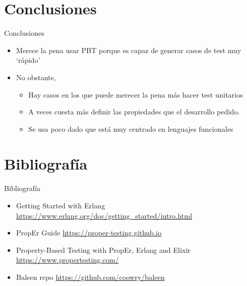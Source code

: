 \documentclass{beamer}
\begin{document}
  \section{Conclusiones}
    \begin{frame}{Conclusiones}
      \begin{itemize}
        \item Merece la pena usar PBT porque es capaz de generar casos de test muy `rápido'
        \item No obstante,
        \begin{itemize}
          \item Hay casos en los que puede merecer la pena más hacer test unitarios
          \item A veces cuesta más definir las propiedades que el desarrollo
          pedido.
          \item Se usa poco dado que está muy centrado en lenguajes funcionales
        \end{itemize}
      \end{itemize}
    \end{frame}

  \section{Bibliografía}
    \begin{frame}{Bibliografía}
      \begin{itemize}
        \item Getting Started with Erlang \url{https://www.erlang.org/doc/getting_started/intro.html}
        \item PropEr Guide \url{https://proper-testing.github.io}
        \item Property-Based Testing with PropEr, Erlang and Elixir \url{https://www.propertesting.com/}
        \item Baleen repo \url{https://github.com/coowry/baleen}
      \end{itemize}
    \end{frame}
\end{document}
